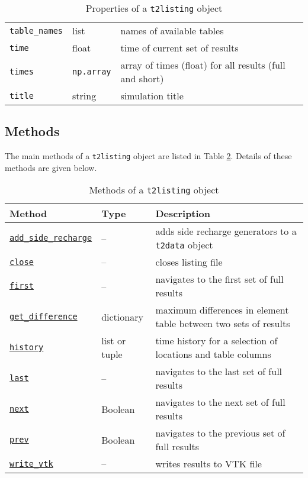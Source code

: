 \begin{table}
\begin{center}
\begin{tabular}{|l|l|p{70mm}|}
      \texttt{table\_names} & list & names of available tables\\
      \texttt{time} & float & time of current set of results\\
      \texttt{times} & \texttt{np.array} & array of times (float) for all results (full and short)\\
      \texttt{title} & string & simulation title\\
      \hline
    \end{tabular}
    \caption{Properties of a \texttt{t2listing} object}
    \label{tb:t2listing_properties}
  \end{center}
\end{table}

\subsection{Methods}
\label{t2listingmethods}

The main methods of a \texttt{t2listing} object are listed in Table \ref{tb:t2listing_methods}.  Details of these methods are given below.

\begin{table}
  \begin{center}
    \begin{tabular}{|l|l|p{80mm}|}
      \hline
      \textbf{Method} & \textbf{Type} & \textbf{Description}\\
      \hline
      \hyperref[sec:t2listing:add_side_recharge]{\texttt{add\_side\_recharge}} & -- & adds side recharge generators to a \texttt{t2data} object\\
      \hyperref[sec:t2listing:close]{\texttt{close}} & -- & closes listing file\\
      \hyperref[sec:t2listing:first]{\texttt{first}} & -- & navigates to the first set of full results\\
      \hyperref[sec:t2listing:get_difference]{\texttt{get\_difference}} & dictionary & maximum differences in element table between two sets of results\\
      \hyperref[sec:t2listing:history]{\texttt{history}} & list or tuple & time history for a selection of locations and table columns\\
      \hyperref[sec:t2listing:last]{\texttt{last}} & -- & navigates to the last set of full results\\
      \hyperref[sec:t2listing:next]{\texttt{next}} & Boolean & navigates to the next set of full results\\
      \hyperref[sec:t2listing:prev]{\texttt{prev}} & Boolean & navigates to the previous set of full results\\
      \hyperref[sec:t2listing:write_vtk]{\texttt{write\_vtk}} & -- & writes results to VTK file\\
      \hline
    \end{tabular}
    \caption{Methods of a \texttt{t2listing} object}
    \label{tb:t2listing_methods}
  \end{center}
\end{table}

